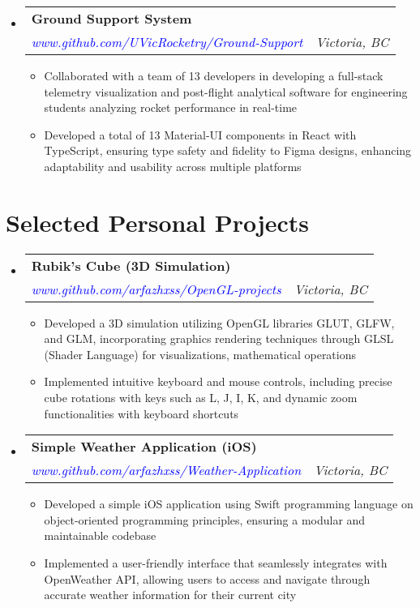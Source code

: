 \documentclass[a4paper,10pt]{article}
\makeatletter
\newcommand{\resumeItemDot}[1]{
  \item \normalsize{#1}
}
\newcommand{\resumeSubheading}[4]{
  \item
    \begin{tabular*}{\dimexpr\textwidth-1.2em\relax}{@{}l@{\extracolsep{\fill}}r@{}}
      \large \textbf{#1} & \text{#2} \\
      \textit{#3} & \textit{#4} \\
    \end{tabular*}\vspace{-2pt}
}
\newenvironment{resumeSubHeadingListStart}
{\begin{itemize}[leftmargin=0.15in, label={}]}
{\end{itemize}}
\newenvironment{resumeItemListStart}
{\begin{itemize}[leftmargin=0.15in, label={$\bullet$}]}
{\end{itemize}}
\makeatother
\begin{document}
\begin{resumeSubHeadingListStart}
\resumeSubheading
    {Ground Support System}
    {Jul 2023 – Jan 2024}
    {\textcolor{blue}{www.github.com/UVicRocketry/Ground-Support}}
    {Victoria, BC}
\begin{resumeItemListStart}
    \resumeItemDot{Collaborated with a team of 13 developers in developing a full-stack telemetry visualization and post-flight analytical software for engineering students analyzing rocket performance in real-time}
    \resumeItemDot{Developed a total of 13 Material-UI components in React with TypeScript, ensuring type safety and fidelity to Figma designs, enhancing adaptability and usability across multiple platforms}
\end{resumeItemListStart}
\end{resumeSubHeadingListStart}

\section{Selected Personal Projects}
\begin{resumeSubHeadingListStart}
\resumeSubheading
    {Rubik’s Cube (3D Simulation)}{Feb 2023 – June 2023}
    {\textcolor{blue}{www.github.com/arfazhxss/OpenGL-projects}}
    {Victoria, BC}
\begin{resumeItemListStart}
    \resumeItemDot{Developed a 3D simulation utilizing OpenGL libraries GLUT, GLFW, and GLM, incorporating graphics rendering techniques through GLSL (Shader Language) for visualizations, mathematical operations}
    \resumeItemDot{Implemented intuitive keyboard and mouse controls, including precise cube rotations with keys such as L, J, I, K, and dynamic zoom functionalities with keyboard shortcuts}
\end{resumeItemListStart}
\end{resumeSubHeadingListStart}

\begin{resumeSubHeadingListStart}
\resumeSubheading
    {Simple Weather Application (iOS)}
    {Apr 2023 – Nov 2023}
    {\textcolor{blue}{www.github.com/arfazhxss/Weather-Application}}
    {Victoria, BC}
\begin{resumeItemListStart}
    \resumeItemDot{Developed a simple iOS application using Swift programming language on object-oriented programming principles, ensuring a modular and maintainable codebase}
    \resumeItemDot{Implemented a user-friendly interface that seamlessly integrates with OpenWeather API, allowing users to access and navigate through accurate weather information for their current city}
\end{resumeItemListStart}
\end{resumeSubHeadingListStart}
\end{document}
